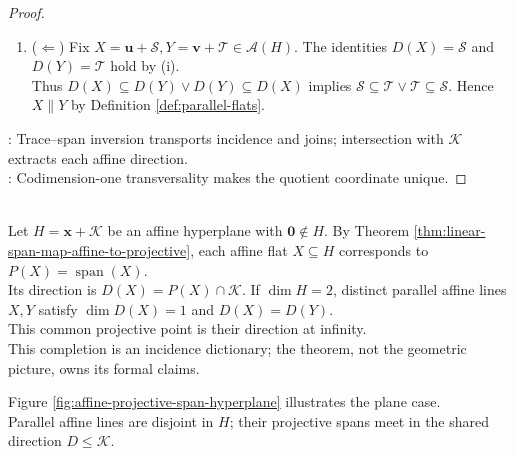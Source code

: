\begin{theorem}
\begin{proof}
\begin{enumerate}[label=(\roman*)]
\item[$(vii)$] ($\Leftarrow$) Fix $X=\mathbf{u}+\mathcal{S},Y=\mathbf{v}+\mathcal{T}\in\mathcal{A}(H)$. The identities $D(X)=\mathcal{S}$ and $D(Y)=\mathcal{T}$ hold by (i).\\
Thus $D(X)\subseteq D(Y)\lor D(Y)\subseteq D(X)$ implies $\mathcal{S}\subseteq\mathcal{T}\lor\mathcal{T}\subseteq\mathcal{S}$. Hence $X\parallel Y$ by Definition \ref{def:parallel-flats}.
\end{enumerate}
: Trace--span inversion transports incidence and joins; intersection with $\mathcal{K}$ extracts each affine direction.\\
: Codimension-one transversality makes the quotient coordinate unique.
\end{proof}
\end{theorem}

\begin{perspective} \label{per:projective-completion-from-affine-hyperplane} \\
Let $H=\mathbf{x}+\mathcal{K}$ be an affine hyperplane with $\mathbf{0}\notin H$. By Theorem \ref{thm:linear-span-map-affine-to-projective}, each affine flat $X\subseteq H$ corresponds to $P(X)=\operatorname{span}(X)$.\\
Its direction is $D(X)=P(X)\cap\mathcal{K}$. If $\dim H=2$, distinct parallel affine lines $X,Y$ satisfy $\dim D(X)=1$ and $D(X)=D(Y)$.\\
This common projective point is their direction at infinity.\\
This completion is an incidence dictionary; the theorem, not the geometric picture, owns its formal claims.
\end{perspective}

Figure \ref{fig:affine-projective-span-hyperplane} illustrates the plane case.\\
Parallel affine lines are disjoint in $H$; their projective spans meet in the shared direction $D\leq\mathcal{K}$.

\begin{illustrationfigure}[H]
  \centering
  
  \caption{The affine plane $H=\mathbf{x}+\mathcal{K}$ contains the parallel lines $X,Y$. Their shaded spans meet along the dashed subspace $D=P(X)\cap\mathcal{K}=P(Y)\cap\mathcal{K}$. This projective point is their common direction at infinity.}
  \label{fig:affine-projective-span-hyperplane}
\end{illustrationfigure}
